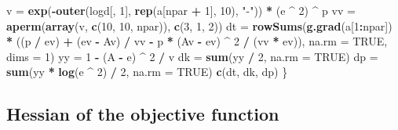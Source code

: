 \documentclass[]{article}
\newenvironment{Shaded}{\begin{snugshade}}{\end{snugshade}}
\newcommand{\DataTypeTok}[1]{\textcolor[rgb]{0.13,0.29,0.53}{#1}}
\newcommand{\DecValTok}[1]{\textcolor[rgb]{0.00,0.00,0.81}{#1}}
\newcommand{\KeywordTok}[1]{\textcolor[rgb]{0.13,0.29,0.53}{\textbf{#1}}}
\newcommand{\NormalTok}[1]{#1}
\newcommand{\OperatorTok}[1]{\textcolor[rgb]{0.81,0.36,0.00}{\textbf{#1}}}
\newcommand{\OtherTok}[1]{\textcolor[rgb]{0.56,0.35,0.01}{#1}}
\newcommand{\StringTok}[1]{\textcolor[rgb]{0.31,0.60,0.02}{#1}}
\begin{document}
\begin{Shaded}
\begin{Highlighting}[]
\NormalTok{  v =}\StringTok{ }\KeywordTok{exp}\NormalTok{(}\OperatorTok{-}\KeywordTok{outer}\NormalTok{(logd[, }\DecValTok{1}\NormalTok{], }\KeywordTok{rep}\NormalTok{(a[npar }\OperatorTok{+}\StringTok{ }\DecValTok{1}\NormalTok{], }\DecValTok{10}\NormalTok{), }\StringTok{"-"}\NormalTok{)) }\OperatorTok{*}\StringTok{ }\NormalTok{(e }\OperatorTok{^}\StringTok{ }\DecValTok{2}\NormalTok{) }\OperatorTok{^}\StringTok{ }\NormalTok{p}
\NormalTok{  vv =}\StringTok{ }\KeywordTok{aperm}\NormalTok{(}\KeywordTok{array}\NormalTok{(v, }\KeywordTok{c}\NormalTok{(}\DecValTok{10}\NormalTok{, }\DecValTok{10}\NormalTok{, npar)), }\KeywordTok{c}\NormalTok{(}\DecValTok{3}\NormalTok{, }\DecValTok{1}\NormalTok{, }\DecValTok{2}\NormalTok{))}
\NormalTok{  dt =}\StringTok{ }\KeywordTok{rowSums}\NormalTok{(}\KeywordTok{g.grad}\NormalTok{(a[}\DecValTok{1}\OperatorTok{:}\NormalTok{npar]) }\OperatorTok{*}\StringTok{ }\NormalTok{((p }\OperatorTok{/}\StringTok{ }\NormalTok{ev) }\OperatorTok{+}\StringTok{ }\NormalTok{(ev }\OperatorTok{-}\StringTok{ }\NormalTok{Av) }\OperatorTok{/}\StringTok{ }\NormalTok{vv }\OperatorTok{-}\StringTok{ }\NormalTok{p }\OperatorTok{*}\StringTok{ }\NormalTok{(Av }\OperatorTok{-}
\StringTok{                                                                       }\NormalTok{ev) }\OperatorTok{^}\StringTok{ }\DecValTok{2} \OperatorTok{/}\StringTok{ }\NormalTok{(vv }\OperatorTok{*}\StringTok{ }\NormalTok{ev)),}
               \DataTypeTok{na.rm =} \OtherTok{TRUE}\NormalTok{,}
               \DataTypeTok{dims =} \DecValTok{1}\NormalTok{)}
\NormalTok{  yy =}\StringTok{ }\DecValTok{1} \OperatorTok{-}\StringTok{ }\NormalTok{(A }\OperatorTok{-}\StringTok{ }\NormalTok{e) }\OperatorTok{^}\StringTok{ }\DecValTok{2} \OperatorTok{/}\StringTok{ }\NormalTok{v}
\NormalTok{  dk =}\StringTok{ }\KeywordTok{sum}\NormalTok{(yy }\OperatorTok{/}\StringTok{ }\DecValTok{2}\NormalTok{, }\DataTypeTok{na.rm =} \OtherTok{TRUE}\NormalTok{)}
\NormalTok{  dp =}\StringTok{ }\KeywordTok{sum}\NormalTok{(yy }\OperatorTok{*}\StringTok{ }\KeywordTok{log}\NormalTok{(e }\OperatorTok{^}\StringTok{ }\DecValTok{2}\NormalTok{) }\OperatorTok{/}\StringTok{ }\DecValTok{2}\NormalTok{, }\DataTypeTok{na.rm =} \OtherTok{TRUE}\NormalTok{)}
  \KeywordTok{c}\NormalTok{(dt, dk, dp)}
\NormalTok{\}}
\end{Highlighting}
\end{Shaded}

\hypertarget{hessian-of-the-objective-function}{%
\subsection{Hessian of the objective
function}\label{hessian-of-the-objective-function}}
\end{document}
